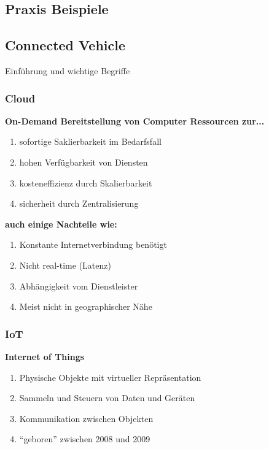 \documentclass{beamer}
\begin{document}
    \subsection{Praxis Beispiele}
    \subsection{Connected Vehicle}


\begin{frame}
	\begin{center}
		\Large Einführung und wichtige Begriffe
	\end{center}
\end{frame}


\begin{frame}
	\frametitle{\textbf{Cloud}}
	\begin{block}{\textbf{On-Demand Bereitstellung von Computer Ressourcen zur...}}
		\begin{enumerate}
			\item sofortige Saklierbarkeit im Bedarfsfall
			\item hohen Verfügbarkeit von Diensten
			\item kosteneffizienz durch Skalierbarkeit
			\item sicherheit durch Zentralisierung
		\end{enumerate}
	\end{block}
	
	\begin{block}{\textbf{auch einige Nachteile wie:}}
		\begin{enumerate}
			\item Konstante Internetverbindung benötigt
			\item Nicht real-time (Latenz)
			\item Abhängigkeit vom Dienstleister
			\item Meist nicht in geographischer Nähe
		\end{enumerate}
	\end{block}
\end{frame}


\begin{frame}
	\frametitle{\textbf{IoT}}
	\begin{block}{\textbf{Internet of Things}}
		\begin{enumerate}
			\item Physische Objekte mit virtueller Repräsentation
			\item Sammeln und Steuern von Daten und Geräten
			\item Kommunikation zwischen Objekten
			\item “geboren” zwischen 2008 und 2009 
		\end{enumerate}
	\end{block}
\end{frame}
\end{document}
